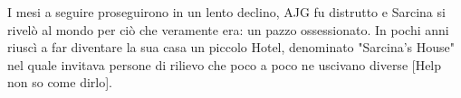 I mesi a seguire proseguirono in un lento declino, AJG fu distrutto e Sarcina si rivelò al mondo per ciò che veramente era: un pazzo ossessionato. In pochi anni riuscì a far diventare la sua casa un piccolo Hotel, denominato "Sarcina's House" nel quale invitava persone di rilievo che poco a poco ne uscivano diverse [Help non so come dirlo]. 
